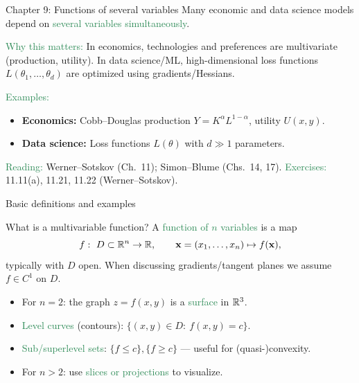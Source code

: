 \documentclass{beamer}
\begin{document}
\begin{frame}{Chapter 9: Functions of several variables}
Many economic and data science models depend on \textcolor{SeaGreen}{several variables simultaneously}.

\vskip 6pt
\textcolor{SeaGreen}{Why this matters:} In economics, technologies and preferences are multivariate (production, utility). In data science/ML, high-dimensional loss functions \(L(\theta_1,\dots,\theta_d)\) are optimized using gradients/Hessians.

\vskip 8pt
\textcolor{SeaGreen}{Examples:}
\begin{itemize}
\item \textbf{Economics:} Cobb--Douglas production \(Y=K^\alpha L^{1-\alpha}\), utility \(U(x,y)\).
\item \textbf{Data science:} Loss functions \(L(\theta)\) with \(d\gg1\) parameters.
\end{itemize}

\vskip 8pt
\textcolor{SeaGreen}{Reading:} Werner--Sotskov (Ch.~11); Simon--Blume (Chs.~14, 17). \quad
\textcolor{SeaGreen}{Exercises:} 11.11(a), 11.21, 11.22 (Werner--Sotskov).
\end{frame}

\begin{frame} \begin{center}
	\alert{\Huge Basic definitions and examples}
\end{center}\end{frame}

\begin{frame}{What is a multivariable function?}
A \textcolor{SeaGreen}{function of \(n\) variables} is a map
\[
f:\ D \subset \mathbb R^n \to \mathbb R, 
\qquad \mathbf{x}=(x_1,\dots,x_n)\mapsto f(\mathbf{x}),
\]
typically with \(D\) open. When discussing gradients/tangent planes we assume \(f\in C^1\) on \(D\).

\begin{itemize}
\item For \(n=2\): the graph \(z=f(x,y)\) is a \textcolor{SeaGreen}{surface} in \(\mathbb R^3\).
\item \textcolor{SeaGreen}{Level curves} (contours): \(\{(x,y)\in D:\ f(x,y)=c\}\).
\item \textcolor{SeaGreen}{Sub/superlevel sets}: \(\{f\le c\},\{f\ge c\}\) — useful for (quasi-)convexity.
\item For \(n>2\): use \textcolor{SeaGreen}{slices or projections} to visualize.
\end{itemize}
\end{frame}
\end{document}
